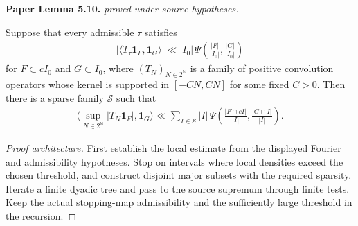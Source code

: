 \begin{lemma}
\par\medskip\noindent\textbf{Paper Lemma 5.10.} \textit{proved under source hypotheses.}\par
Suppose that every admissible $\tau$ satisfies
\begin{align}
 |\langle T_\tau\mathbf1_F,\mathbf1_G\rangle|
 \ll |I_0|\,\Psi\left(\frac{|F|}{|I_0|},
                       \frac{|G|}{|I_0|}\right)
\end{align}
for $F\subset cI_0$ and $G\subset I_0$, where $(T_N)_{N\in2^{\mathbb N}}$ is a family of positive convolution operators whose kernel is supported in
$[-CN,CN]$ for some fixed $C>0$.  Then there is a sparse family $\mathcal S$ such that
\begin{align}
 \langle\sup_{N\in2^{\mathbb N}}|T_N\mathbf1_F|,\mathbf1_G\rangle
 \ll\sum_{I\in\mathcal S}|I|\,
 \Psi\left(\frac{|F\cap cI|}{|I|},
            \frac{|G\cap I|}{|I|}\right).
\end{align}
\end{lemma}
\begin{proof}[Proof architecture]
\leanok
First establish the local estimate from the displayed Fourier and admissibility hypotheses. Stop on intervals where local densities exceed the chosen threshold, and construct disjoint major subsets with the required sparsity. Iterate a finite dyadic tree and pass to the source supremum through finite tests. Keep the actual stopping-map admissibility and the sufficiently large threshold in the recursion.
\end{proof}

